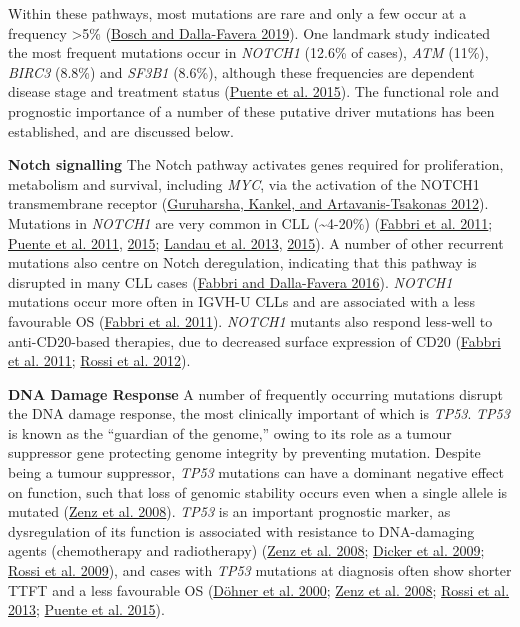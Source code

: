 \documentclass[11pt, a4paper, twosided]{book}
\begin{document}
Within these pathways, most mutations are rare and only a few occur at a frequency \textgreater5\% (\protect\hyperlink{ref-Bosch2019}{Bosch and Dalla-Favera 2019}). One landmark study indicated the most frequent mutations occur in \emph{NOTCH1} (12.6\% of cases), \emph{ATM} (11\%), \emph{BIRC3} (8.8\%) and \emph{SF3B1} (8.6\%), although these frequencies are dependent disease stage and treatment status (\protect\hyperlink{ref-Puente2015}{Puente et al. 2015}). The functional role and prognostic importance of a number of these putative driver mutations has been established, and are discussed below.

\textbf{Notch signalling}
The Notch pathway activates genes required for proliferation, metabolism and survival, including \emph{MYC}, via the activation of the NOTCH1 transmembrane receptor (\protect\hyperlink{ref-Guruharsha2012}{Guruharsha, Kankel, and Artavanis-Tsakonas 2012}). Mutations in \emph{NOTCH1} are very common in CLL (\textasciitilde4-20\%) (\protect\hyperlink{ref-Fabbri2011}{Fabbri et al. 2011}; \protect\hyperlink{ref-Puente2011}{Puente et al. 2011}, \protect\hyperlink{ref-Puente2015}{2015}; \protect\hyperlink{ref-Landau2013}{Landau et al. 2013}, \protect\hyperlink{ref-Landau2015}{2015}). A number of other recurrent mutations also centre on Notch deregulation, indicating that this pathway is disrupted in many CLL cases (\protect\hyperlink{ref-Fabbri2016}{Fabbri and Dalla-Favera 2016}). \emph{NOTCH1} mutations occur more often in IGVH-U CLLs and are associated with a less favourable OS (\protect\hyperlink{ref-Fabbri2011}{Fabbri et al. 2011}). \emph{NOTCH1} mutants also respond less-well to anti-CD20-based therapies, due to decreased surface expression of CD20 (\protect\hyperlink{ref-Fabbri2011}{Fabbri et al. 2011}; \protect\hyperlink{ref-Rossi2012}{Rossi et al. 2012}).

\textbf{DNA Damage Response}
A number of frequently occurring mutations disrupt the DNA damage response, the most clinically important of which is \emph{TP53}. \emph{TP53} is known as the ``guardian of the genome,'' owing to its role as a tumour suppressor gene protecting genome integrity by preventing mutation. Despite being a tumour suppressor, \emph{TP53} mutations can have a dominant negative effect on function, such that loss of genomic stability occurs even when a single allele is mutated (\protect\hyperlink{ref-Zenz2008}{Zenz et al. 2008}). \emph{TP53} is an important prognostic marker, as dysregulation of its function is associated with resistance to DNA-damaging agents (chemotherapy and radiotherapy) (\protect\hyperlink{ref-Zenz2008}{Zenz et al. 2008}; \protect\hyperlink{ref-Dicker2009}{Dicker et al. 2009}; \protect\hyperlink{ref-Rossi2009}{Rossi et al. 2009}), and cases with \emph{TP53} mutations at diagnosis often show shorter TTFT and a less favourable OS (\protect\hyperlink{ref-Dohner2000}{Döhner et al. 2000}; \protect\hyperlink{ref-Zenz2008}{Zenz et al. 2008}; \protect\hyperlink{ref-Rossi2013}{Rossi et al. 2013}; \protect\hyperlink{ref-Puente2015}{Puente et al. 2015}).
\end{document}
